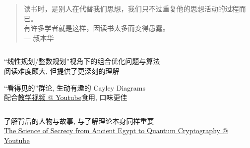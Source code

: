 \begin{frame}{}
  \begin{quote}
	读书时，是别人在代替我们思想，我们只不过重复他的思想活动的过程而已。\\[15pt]
	有许多学者就是这样，因读书太多而变得愚蠢。\\[10pt]
	\hfill --- 叔本华
  \end{quote}
\end{frame}

\begin{frame}{}
  \begin{columns}
  \end{columns}

  \vspace{0.80cm}
  \begin{center}
	``线性规划/整数规划''视角下的组合优化问题与算法 \\[8pt]
	阅读难度颇大, 但提供了更深刻的理解
  \end{center}
\end{frame}

\begin{frame}{}

  \vspace{0.10cm}
  \begin{center}
    ``看得见的''群论, 生动有趣的 Cayley Diagrams \\[8pt]
	配合\href{https://www.youtube.com/playlist?list=PLwV-9DG53NDxU337smpTwm6sef4x-SCLv}{教学视频 @ Youtube}食用, 口味更佳 \\[10pt]
  \end{center}
\end{frame}

\begin{frame}
  \begin{columns}
  \end{columns}

  \vspace{0.50cm}
  \begin{center}
    了解背后的人物与故事, 与了解理论本身同样重要\\[10pt]

    \href{https://youtu.be/hMKwEO2DEkk}{\small The Science of Secrecy from Ancient Egypt to Quantum Cryptography @ Youtube}
  \end{center}
\end{frame}

